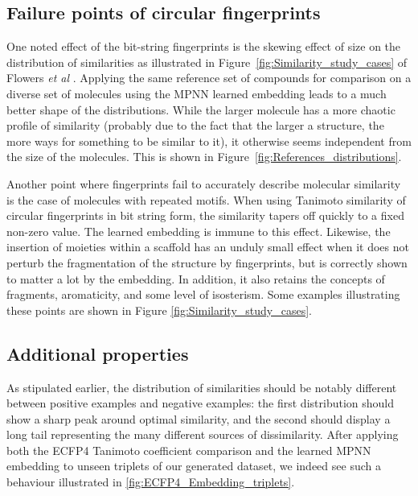 \documentclass[doublespacing]{bmcart}
\begin{document}
\subsection*{Failure points of circular fingerprints}
One noted effect of the bit-string fingerprints is the skewing effect of size on the distribution of similarities as illustrated in Figure~\ref{fig:Similarity_study_cases} of Flowers \textit{et al} \cite{flower1998properties}. Applying the same reference set of compounds for comparison on a diverse set of molecules using the MPNN learned embedding leads to a much better shape of the distributions. While the larger molecule has a more chaotic profile of similarity (probably due to the fact that the larger a structure, the more ways for something to be similar to it), it otherwise seems  independent from the size of the molecules. This is shown in Figure~\ref{fig:References_distributions}.




Another point where fingerprints fail to accurately describe molecular similarity is the case of molecules with repeated motifs. When using Tanimoto similarity of circular fingerprints in bit string form, the similarity tapers off quickly to a fixed non-zero value. The learned embedding is immune to this effect. Likewise, the insertion of moieties within a scaffold has an unduly small effect when it does not perturb the fragmentation of the structure by fingerprints, but is correctly shown to matter a lot by the embedding. In addition, it also retains the concepts of fragments, aromaticity, and some level of isosterism. Some examples illustrating these points are shown in Figure \ref{fig:Similarity_study_cases}.





\subsection*{Additional properties}
As stipulated earlier, the distribution of similarities should be notably different between positive examples and negative examples: the first distribution should show a sharp peak around optimal similarity, and the second should display a long tail representing the many different sources of dissimilarity. After applying both the ECFP4 Tanimoto coefficient comparison and the learned MPNN embedding to unseen triplets of our generated dataset, we indeed see such a behaviour illustrated in \ref{fig:ECFP4_Embedding_triplets}.
\end{document}

